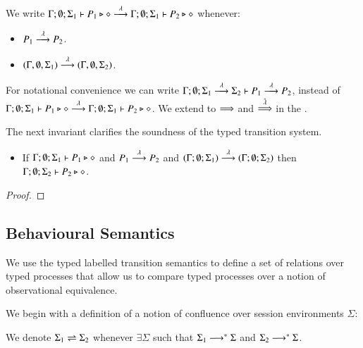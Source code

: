\begin{definition}\rm
	We write $\Gamma; \emptyset; \Sigma_1 \vdash P_1 \triangleright \diamond \stackrel{\lambda}{\longrightarrow} \Gamma; \emptyset; \Sigma_1 \vdash P_2 \triangleright \diamond$
	whenever:
	\begin{itemize}
		\item	$P_1 \stackrel{\lambda}{\longrightarrow} P_2$.
		\item	$(\Gamma, \emptyset, \Sigma_1) \stackrel{\lambda}{\longrightarrow} (\Gamma, \emptyset, \Sigma_2)$.
	\end{itemize}
\end{definition}

For notational convenience we can write
$\Gamma; \emptyset; \Sigma_1 \stackrel{\lambda}{\longrightarrow} \Sigma_2 \vdash P_1 \stackrel{\lambda}{\longrightarrow} P_2$,
instead of $\Gamma; \emptyset; \Sigma_1 \vdash P_1 \triangleright \diamond \stackrel{\lambda}{\longrightarrow} \Gamma; \emptyset; \Sigma_1 \vdash P_2 \triangleright \diamond$.
We extend to $\stackrel{}{\Longrightarrow}$ and $\stackrel{\hat{\lambda}}{\Longrightarrow}$ in the .

The next invariant clarifies the soundness of the
typed transition system.

\begin{lemma}[Invariant]
	\begin{itemize}
		\item	If $\Gamma; \emptyset; \Sigma_1 \vdash P_1 \triangleright \diamond$ and
			$P_1 \stackrel{\lambda}{\longrightarrow} P_2$ and $(\Gamma; \emptyset; \Sigma_1) \stackrel{\lambda}{\longrightarrow} (\Gamma; \emptyset; \Sigma_2)$
			then $\Gamma; \emptyset; \Sigma_2 \vdash P_2 \triangleright \diamond$.
	\end{itemize}
\end{lemma}

\begin{proof}
\end{proof}

\subsection{Behavioural Semantics}

We use the typed labelled transition semantics to define
a set of relations over typed processes that allow us to compare
typed processes over a notion of observational equivalence.


We begin with a definition of a notion of confluence
over session environments $\Sigma$:
\begin{definition}\rm
	We denote $\Sigma_1 \rightleftharpoons \Sigma_2$ whenever $\exists \Sigma$ such that
	$\Sigma_1 \longrightarrow^* \Sigma$ and $\Sigma_2 \longrightarrow^* \Sigma$.
\end{definition}

